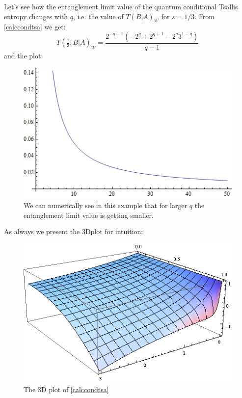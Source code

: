 Let's see how the entanglement limit value of the quantum conditional Tsallis entropy changes with $q$, i.e. the value of $T(B|A)_{W}$ for $s=1/3$. From \eqref{calccondtsa} we get:
\begin{equation}
T(\tfrac{1}{3};B|A)_W= \frac{2^{-q-1} \left(-2^q+2^{q+1}-2^q 3^{1-q}\right)}{q-1}
\end{equation}
and the plot:
\begin{figure}[H]
\label{figure2}
\begin{center}
\includegraphics[scale=0.7]{figures/diag1.png}
\caption{We can numerically see in this example that for larger $q$ the entanglement limit value is getting smaller.}\label{figr1}
\end{center}
\end{figure}
\noindent
As always we present the 3Dplot for intuition:
\begin{figure}[H]
\label{figure2}
\begin{center}
\includegraphics[scale=0.8]{figures/3DplotTsallis.png}\caption{The 3D plot of \eqref{calccondtsa}}
\label{figr2}
\end{center}
\end{figure}
